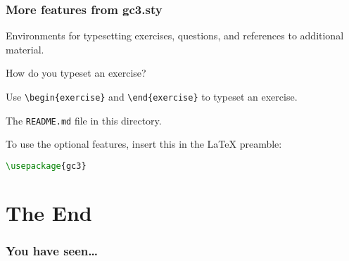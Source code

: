 \documentclass[english,serif,mathserif,usenames,dvipsnames]{beamer}
\begin{document}
\begin{frame}[fragile]
  \frametitle{More features from gc3.sty}

  Environments for typesetting exercises, questions, and references to additional material.

  \begin{question}
    How do you typeset an exercise?
  \end{question}

  \+
  \begin{exercise}
    Use \lstinline|\begin{exercise}| and \lstinline|\end{exercise}| to
    typeset an exercise.
  \end{exercise}

  \begin{seealso}
    The \texttt{README.md} file in this directory.
  \end{seealso}

  \+
  To use the optional features, insert this in the \LaTeX{} preamble:
\begin{lstlisting}[language=tex]
\usepackage{gc3}
\end{lstlisting}
\end{frame}

\section{The End}
\begin{frame}[fragile]
  \frametitle{You have seen\ldots}
  \tableofcontents[sectionstyle=show/shaded]
\end{frame}
\end{document}
